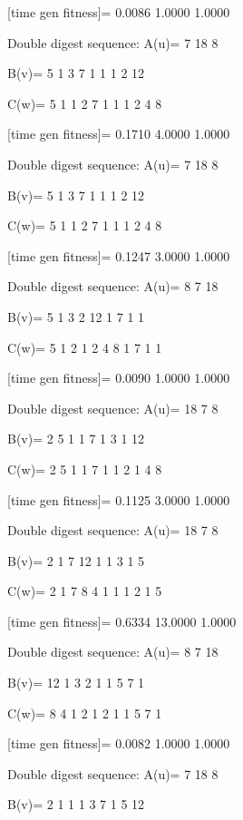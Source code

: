 [time gen fitness]=
    0.0086    1.0000    1.0000

Double digest sequence:
A(u)=
     7    18     8

B(v)=
     5     1     3     7     1     1     1     2    12

C(w)=
     5     1     1     2     7     1     1     1     2     4     8

[time gen fitness]=
    0.1710    4.0000    1.0000

Double digest sequence:
A(u)=
     7    18     8

B(v)=
     5     1     3     7     1     1     1     2    12

C(w)=
     5     1     1     2     7     1     1     1     2     4     8

[time gen fitness]=
    0.1247    3.0000    1.0000

Double digest sequence:
A(u)=
     8     7    18

B(v)=
     5     1     3     2    12     1     7     1     1

C(w)=
     5     1     2     1     2     4     8     1     7     1     1

[time gen fitness]=
    0.0090    1.0000    1.0000

Double digest sequence:
A(u)=
    18     7     8

B(v)=
     2     5     1     1     7     1     3     1    12

C(w)=
     2     5     1     1     7     1     1     2     1     4     8

[time gen fitness]=
    0.1125    3.0000    1.0000

Double digest sequence:
A(u)=
    18     7     8

B(v)=
     2     1     7    12     1     1     3     1     5

C(w)=
     2     1     7     8     4     1     1     1     2     1     5

[time gen fitness]=
    0.6334   13.0000    1.0000

Double digest sequence:
A(u)=
     8     7    18

B(v)=
    12     1     3     2     1     1     5     7     1

C(w)=
     8     4     1     2     1     2     1     1     5     7     1

[time gen fitness]=
    0.0082    1.0000    1.0000

Double digest sequence:
A(u)=
     7    18     8

B(v)=
     2     1     1     1     3     7     1     5    12

